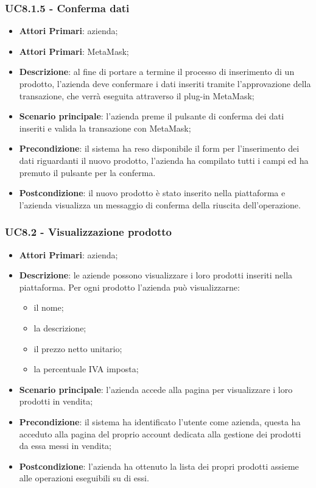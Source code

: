 \subsubsection{UC8.1.5 - Conferma dati}
\begin{itemize}
	\item \textbf{Attori Primari}: azienda;
	\item \textbf{Attori Primari}: MetaMask\glo;
	\item \textbf{Descrizione}: al fine di portare a termine il processo di inserimento di un prodotto, l'azienda deve confermare i dati inseriti tramite l'approvazione della transazione, che verrà eseguita attraverso il plug-in MetaMask\glo;
	\item \textbf{Scenario principale}: l'azienda preme il pulsante di conferma dei dati inseriti e valida la transazione con MetaMask\glo;
	\item \textbf{Precondizione}: il sistema ha reso disponibile il form per l'inserimento dei dati riguardanti il nuovo prodotto, l'azienda ha compilato tutti i campi ed ha premuto il pulsante per la conferma.
	\item \textbf{Postcondizione}: il nuovo prodotto è stato inserito nella piattaforma e l'azienda visualizza un messaggio di conferma della riuscita dell'operazione.
\end{itemize}

\subsubsection{UC8.2 - Visualizzazione prodotto}
\begin{itemize}
	\item \textbf{Attori Primari}: azienda;
	\item \textbf{Descrizione}: le aziende possono visualizzare i loro prodotti inseriti nella piattaforma. Per ogni prodotto l'azienda può visualizzarne:
	\begin{itemize}
		\item il nome;
		\item la descrizione;
		\item il prezzo netto unitario;
		\item la percentuale IVA imposta;
	\end{itemize}
	\item \textbf{Scenario principale}: l'azienda accede alla pagina per visualizzare i loro prodotti in vendita;	
	\item \textbf{Precondizione}: il sistema ha identificato l'utente come azienda, questa ha acceduto alla pagina del proprio account dedicata alla gestione dei prodotti da essa messi in vendita;
	\item \textbf{Postcondizione}: l'azienda ha ottenuto la lista dei propri prodotti assieme alle operazioni eseguibili su di essi.	
\end{itemize}

